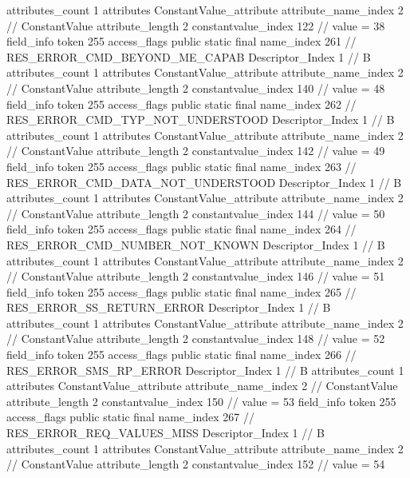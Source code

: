 {{{{{				attributes_count	1
				attributes {
				ConstantValue_attribute {
					attribute_name_index	2		// ConstantValue
					attribute_length	2
					constantvalue_index	122		// value = 38
				}
				}
			}
			field_info {
				token	255
				access_flags	public static final
				name_index	261		// RES_ERROR_CMD_BEYOND_ME_CAPAB
				Descriptor_Index	1		// B
				attributes_count	1
				attributes {
				ConstantValue_attribute {
					attribute_name_index	2		// ConstantValue
					attribute_length	2
					constantvalue_index	140		// value = 48
				}
				}
			}
			field_info {
				token	255
				access_flags	public static final
				name_index	262		// RES_ERROR_CMD_TYP_NOT_UNDERSTOOD
				Descriptor_Index	1		// B
				attributes_count	1
				attributes {
				ConstantValue_attribute {
					attribute_name_index	2		// ConstantValue
					attribute_length	2
					constantvalue_index	142		// value = 49
				}
				}
			}
			field_info {
				token	255
				access_flags	public static final
				name_index	263		// RES_ERROR_CMD_DATA_NOT_UNDERSTOOD
				Descriptor_Index	1		// B
				attributes_count	1
				attributes {
				ConstantValue_attribute {
					attribute_name_index	2		// ConstantValue
					attribute_length	2
					constantvalue_index	144		// value = 50
				}
				}
			}
			field_info {
				token	255
				access_flags	public static final
				name_index	264		// RES_ERROR_CMD_NUMBER_NOT_KNOWN
				Descriptor_Index	1		// B
				attributes_count	1
				attributes {
				ConstantValue_attribute {
					attribute_name_index	2		// ConstantValue
					attribute_length	2
					constantvalue_index	146		// value = 51
				}
				}
			}
			field_info {
				token	255
				access_flags	public static final
				name_index	265		// RES_ERROR_SS_RETURN_ERROR
				Descriptor_Index	1		// B
				attributes_count	1
				attributes {
				ConstantValue_attribute {
					attribute_name_index	2		// ConstantValue
					attribute_length	2
					constantvalue_index	148		// value = 52
				}
				}
			}
			field_info {
				token	255
				access_flags	public static final
				name_index	266		// RES_ERROR_SMS_RP_ERROR
				Descriptor_Index	1		// B
				attributes_count	1
				attributes {
				ConstantValue_attribute {
					attribute_name_index	2		// ConstantValue
					attribute_length	2
					constantvalue_index	150		// value = 53
				}
				}
			}
			field_info {
				token	255
				access_flags	public static final
				name_index	267		// RES_ERROR_REQ_VALUES_MISS
				Descriptor_Index	1		// B
				attributes_count	1
				attributes {
				ConstantValue_attribute {
					attribute_name_index	2		// ConstantValue
					attribute_length	2
					constantvalue_index	152		// value = 54
}}}}}}}
